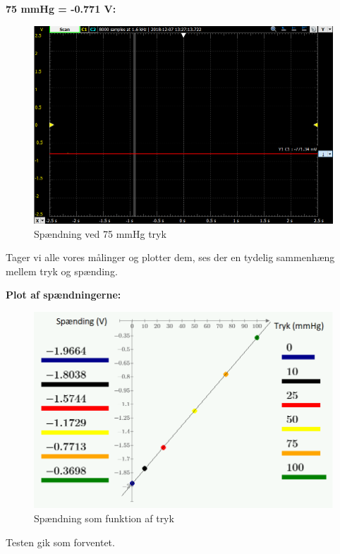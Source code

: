 \textbf{75 mmHg  =  -0.771 V:}

\begin{figure}[h!]
	\centering
	\includegraphics[width=1\linewidth]{Hardwaredesign/mmHg75}
	\caption{Spændning ved 75 mmHg tryk}
	\label{fig:75mmHg}
\end{figure}
\newpage
Tager vi alle vores målinger og plotter dem, ses der en tydelig sammenhæng mellem tryk og spænding.

\vspace{0.2 cm}

\textbf{Plot af spændningerne:}

\vspace{0.2 cm}

\begin{figure}[h!]
	\centering
	\includegraphics[width=1\linewidth]{Hardwaredesign/trykgraf}
	\caption{Spændning som funktion af tryk}
	\label{fig:trykgraf}
\end{figure}

Testen gik som forventet.


